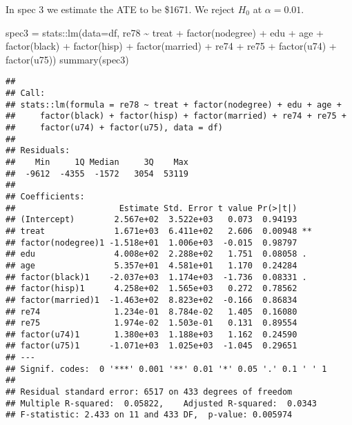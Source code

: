 \documentclass[
]{article}
\newenvironment{Shaded}{\begin{snugshade}}{\end{snugshade}}
\newcommand{\AttributeTok}[1]{\textcolor[rgb]{0.77,0.63,0.00}{#1}}
\newcommand{\FunctionTok}[1]{\textcolor[rgb]{0.00,0.00,0.00}{#1}}
\newcommand{\NormalTok}[1]{#1}
\newcommand{\OtherTok}[1]{\textcolor[rgb]{0.56,0.35,0.01}{#1}}
\newcommand{\SpecialCharTok}[1]{\textcolor[rgb]{0.00,0.00,0.00}{#1}}
\begin{document}
In spec 3 we estimate the ATE to be \$1671. We reject \(H_0\) at
\(\alpha = 0.01\).

\begin{Shaded}
\begin{Highlighting}[]
\NormalTok{spec3 }\OtherTok{=}\NormalTok{ stats}\SpecialCharTok{::}\FunctionTok{lm}\NormalTok{(}\AttributeTok{data=}\NormalTok{df, re78 }\SpecialCharTok{\textasciitilde{}}\NormalTok{ treat }\SpecialCharTok{+} \FunctionTok{factor}\NormalTok{(nodegree) }\SpecialCharTok{+}\NormalTok{ edu }\SpecialCharTok{+}\NormalTok{ age }
                  \SpecialCharTok{+} \FunctionTok{factor}\NormalTok{(black) }\SpecialCharTok{+} \FunctionTok{factor}\NormalTok{(hisp) }\SpecialCharTok{+} \FunctionTok{factor}\NormalTok{(married) }
                  \SpecialCharTok{+}\NormalTok{ re74 }\SpecialCharTok{+}\NormalTok{ re75 }\SpecialCharTok{+} \FunctionTok{factor}\NormalTok{(u74) }\SpecialCharTok{+} \FunctionTok{factor}\NormalTok{(u75))}
\FunctionTok{summary}\NormalTok{(spec3)}
\end{Highlighting}
\end{Shaded}

\begin{verbatim}
## 
## Call:
## stats::lm(formula = re78 ~ treat + factor(nodegree) + edu + age + 
##     factor(black) + factor(hisp) + factor(married) + re74 + re75 + 
##     factor(u74) + factor(u75), data = df)
## 
## Residuals:
##    Min     1Q Median     3Q    Max 
##  -9612  -4355  -1572   3054  53119 
## 
## Coefficients:
##                     Estimate Std. Error t value Pr(>|t|)   
## (Intercept)        2.567e+02  3.522e+03   0.073  0.94193   
## treat              1.671e+03  6.411e+02   2.606  0.00948 **
## factor(nodegree)1 -1.518e+01  1.006e+03  -0.015  0.98797   
## edu                4.008e+02  2.288e+02   1.751  0.08058 . 
## age                5.357e+01  4.581e+01   1.170  0.24284   
## factor(black)1    -2.037e+03  1.174e+03  -1.736  0.08331 . 
## factor(hisp)1      4.258e+02  1.565e+03   0.272  0.78562   
## factor(married)1  -1.463e+02  8.823e+02  -0.166  0.86834   
## re74               1.234e-01  8.784e-02   1.405  0.16080   
## re75               1.974e-02  1.503e-01   0.131  0.89554   
## factor(u74)1       1.380e+03  1.188e+03   1.162  0.24590   
## factor(u75)1      -1.071e+03  1.025e+03  -1.045  0.29651   
## ---
## Signif. codes:  0 '***' 0.001 '**' 0.01 '*' 0.05 '.' 0.1 ' ' 1
## 
## Residual standard error: 6517 on 433 degrees of freedom
## Multiple R-squared:  0.05822,    Adjusted R-squared:  0.0343 
## F-statistic: 2.433 on 11 and 433 DF,  p-value: 0.005974
\end{verbatim}
\end{document}
